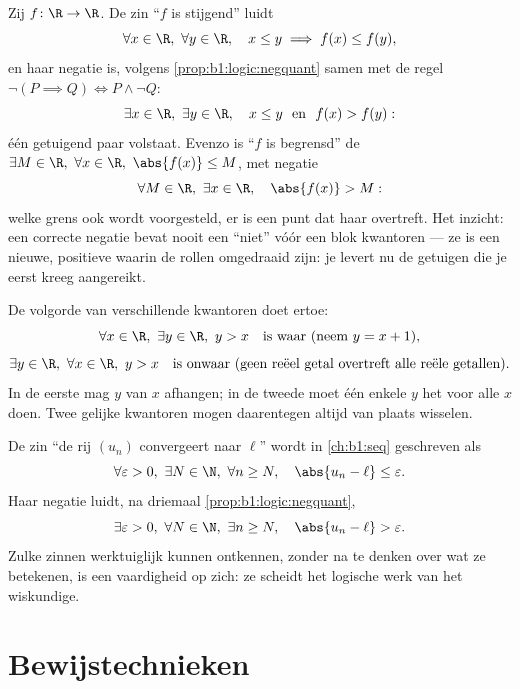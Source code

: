 \begin{example}\label{ex:b1:logic:negpractice}
Zij $f \colon \R \to \R$. De zin ``$f$ is stijgend'' luidt
\[
\forall x \in \R,\ \forall y \in \R,\quad
x \leq y \implies f(x) \leq f(y) ,
\]
en haar negatie is, volgens \cref{prop:b1:logic:negquant} samen met de
regel $\lnot(P \implies Q) \iff P \land \lnot Q$:
\[
\exists x \in \R,\ \exists y \in \R,\quad
x \leq y \ \text{ en }\ f(x) > f(y) :
\]
één getuigend paar volstaat. Evenzo is ``$f$ is begrensd'' de 
$\exists M \in \R,\ \forall x \in \R,\ \abs{f(x)} \leq M$, met negatie
\[
\forall M \in \R,\ \exists x \in \R,\quad \abs{f(x)} > M :
\]
welke grens ook wordt voorgesteld, er is een punt dat haar overtreft.
Het inzicht: een correcte negatie bevat nooit een ``niet'' vóór een blok
kwantoren --- ze is een nieuwe, positieve  waarin de rollen
omgedraaid zijn: je levert nu de getuigen die je eerst kreeg aangereikt.
\end{example}

\begin{example}\label{ex:b1:logic:order}
De volgorde van verschillende kwantoren doet ertoe:
\[
\forall x \in \R,\ \exists y \in \R,\ y > x
\quad\text{is waar (neem } y = x+1\text{),}
\]
\[
\exists y \in \R,\ \forall x \in \R,\ y > x
\quad\text{is onwaar (geen reëel getal overtreft alle reële getallen).}
\]
In de eerste  mag $y$ van $x$ afhangen; in de tweede moet één
enkele $y$ het voor alle $x$ doen. Twee gelijke kwantoren mogen daarentegen
altijd van plaats wisselen.
\end{example}

\begin{example}\label{ex:b1:logic:limit}
De zin ``de rij $(u_n)$ convergeert naar $\ell$'' wordt in
\cref{ch:b1:seq} geschreven als
\[
\forall \varepsilon > 0,\ \exists N \in \N,\ \forall n \geq N,\quad
\abs{u_n - \ell} \leq \varepsilon .
\]
Haar negatie luidt, na driemaal \cref{prop:b1:logic:negquant},
\[
\exists \varepsilon > 0,\ \forall N \in \N,\ \exists n \geq N,\quad
\abs{u_n - \ell} > \varepsilon .
\]
Zulke zinnen werktuiglijk kunnen ontkennen, zonder na te denken over wat
ze betekenen, is een vaardigheid op zich: ze scheidt het logische werk
van het wiskundige.
\end{example}

\section{Bewijstechnieken}

